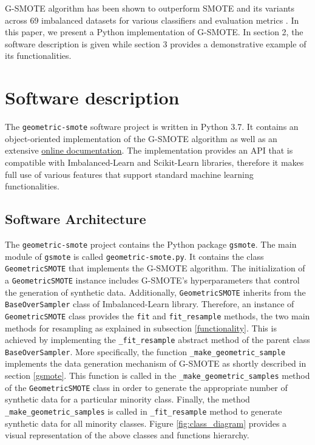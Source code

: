 \documentclass[preprint,12pt, a4paper]{elsarticle}
\begin{document}
G-SMOTE algorithm has been shown to outperform SMOTE and its variants across 69 imbalanced datasets for various classifiers and evaluation metrics \cite{Douzas2019}. In this paper, we present a Python implementation of G-SMOTE. In section 2, the software description is given while section 3 provides a demonstrative example of its functionalities.

\section{Software description}

The \texttt{geometric-smote} software project is written in Python 3.7. It contains an object-oriented implementation of the G-SMOTE algorithm as well as an extensive \href{https://geometric-smote.readthedocs.io/}{online documentation}. The implementation provides an API that is compatible with Imbalanced-Learn and Scikit-Learn libraries, therefore it makes full use of various features that support standard machine learning functionalities.

\subsection{Software Architecture}
\label{architecture}

The \texttt{geometric-smote} project contains the Python package \texttt{gsmote}. The main module of \texttt{gsmote} is called \texttt{geometric-smote.py}. It contains the class \texttt{GeometricSMOTE} that implements the G-SMOTE algorithm. The initialization of a \texttt{GeometricSMOTE} instance includes G-SMOTE's hyperparameters that control the generation of synthetic data. Additionally, \texttt{GeometricSMOTE} inherits from the \texttt{BaseOverSampler} class of Imbalanced-Learn library. Therefore, an instance of \texttt{GeometricSMOTE} class provides the \texttt{fit} and \texttt{fit\_resample} methods, the two main methods for resampling as explained in subsection \ref{functionality}. This is achieved by implementing the \texttt{\_fit\_resample} abstract method of the parent class \texttt{BaseOverSampler}. More specifically, the function \texttt{\_make\_geometric\_sample} implements the data generation mechanism of G-SMOTE as shortly described in section \ref{gsmote}. This function is called in the \texttt{\_make\_geometric\_samples} method of the \texttt{GeometricSMOTE} class in order to generate the appropriate number of synthetic data for a particular minority class. Finally, the method \texttt{\_make\_geometric\_samples} is called in \texttt{\_fit\_resample} method to generate synthetic data for all minority classes. Figure \ref{fig:class_diagram} provides a visual representation of the above classes and functions hierarchy.
\end{document}
